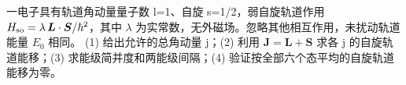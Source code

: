 一电子具有轨道角动量量子数 l=1、自旋 s=1/2，弱自旋轨道作用 \(H_{\rm so}=\lambda\,\boldsymbol L\cdot\boldsymbol S/\hbar^2\)，其中 \(\lambda \) 为实常数，无外磁场。忽略其他相互作用，未扰动轨道能量 \(E_0\) 相同。
(1) 给出允许的总角动量 j；(2) 利用 \(\boldsymbol J=\boldsymbol L+\boldsymbol S\) 求各 j 的自旋轨道能移；(3) 求能级简并度和两能级间隔；(4) 验证按全部六个态平均的自旋轨道能移为零。
